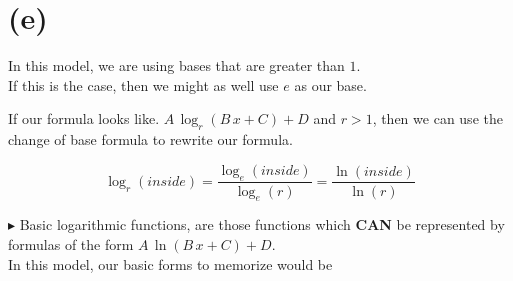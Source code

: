 \documentclass{ximera}
\begin{document}
\section*{(e)}



In this model, we are using bases that are greater than $1$.  \\


If this is the case, then we might as well use $e$ as our base. \\


\begin{explanation}


If our formula looks like. $A \, \log_r(B \, x + C) + D$ and $r>1$, then we can use the change of base formula to rewrite our formula.



\[
\log_r(inside) = \frac{\log_e(inside)}{\log_e(r)} = \frac{\ln(inside)}{\ln(r)}
\]


\end{explanation}




\textbf{\textcolor{red!90!darkgray}{$\blacktriangleright$}}  Basic logarithmic functions, are those functions which \textbf{\textcolor{red!80!black}{CAN}} be represented by formulas of the form $A \, \ln(B \, x + C) + D$.  \\






In this model, our basic forms to memorize would be \\
\end{document}
